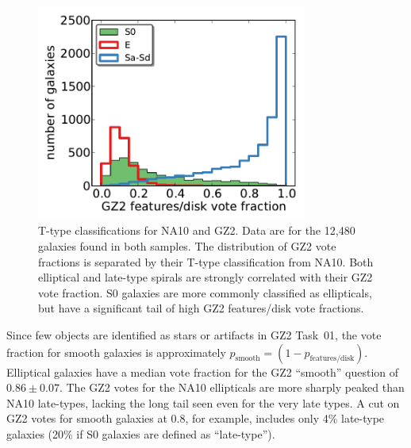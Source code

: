 \documentclass[useAMS,usenatbib]{mn2e}
\begin{document}

\begin{figure}
\includegraphics[angle=0,width=3.5in]{figures/na_ttype.pdf}
\caption{T-type classifications for NA10 and GZ2. Data are for the 12,480 galaxies found in both samples. The distribution of GZ2 vote fractions is separated by their T-type classification from NA10. Both elliptical and late-type spirals are strongly correlated with their GZ2 vote fraction. S0 galaxies are more commonly classified as ellipticals, but have a significant tail of high GZ2 features/disk vote fractions. 
\label{fig-na_ttype}}
\end{figure}

Since few objects are identified as stars or artifacts in GZ2 Task~01, the vote fraction for smooth galaxies is approximately $p_\mathrm{smooth} = (1 - p_\mathrm{features/disk})$. Elliptical galaxies have a median vote fraction for the GZ2 ``smooth'' question of $0.86\pm0.07$. The GZ2 votes for the NA10 ellipticals are more sharply peaked than NA10 late-types, lacking the long tail seen even for the very late types. A cut on GZ2 votes for smooth galaxies at 0.8, for example, includes only 4\% late-type galaxies (20\% if S0 galaxies are defined as ``late-type''). 
\end{document}
